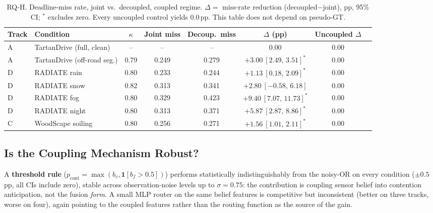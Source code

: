 \documentclass[conference]{IEEEtran}
\begin{document}
\begin{table}[htbp]
\caption{RQ-H. Deadline-miss rate, joint vs.\ decoupled, coupled
regime. $\Delta=$ miss-rate reduction (decoupled$-$joint), pp, 95\%
CI; $^\ast$ excludes zero. Every uncoupled control yields $0.0$\,pp.
This table does not depend on pseudo-GT.}
\label{tab:rqh}
\centering
\small
\setlength{\tabcolsep}{5pt}
\begin{tabular}{llcccccc}
\toprule
\textbf{Track} & \textbf{Condition} & \textbf{$\kappa$} &
\textbf{Joint miss} & \textbf{Decoup.\ miss} &
\textbf{$\Delta$ (pp)} & \textbf{Uncoupled $\Delta$} \\
\midrule
A & TartanDrive (full, clean)   & --   & --    & --    & $0.00$ & $0.00$ \\
A & TartanDrive (off-road seg.) & 0.79 & 0.249 & 0.279 & $+3.00\ [2.49,\,3.51]^\ast$ & $0.00$ \\
D & RADIATE rain                & 0.80 & 0.233 & 0.244 & $+1.13\ [0.18,\,2.09]^\ast$  & $0.00$ \\
D & RADIATE snow                & 0.82 & 0.313 & 0.341 & $+2.80\ [-0.58,\,6.18]$      & $0.00$ \\
D & RADIATE fog                 & 0.80 & 0.329 & 0.423 & $+9.40\ [7.07,\,11.73]^\ast$ & $0.00$ \\
D & RADIATE night               & 0.80 & 0.313 & 0.371 & $+5.87\ [2.87,\,8.86]^\ast$  & $0.00$ \\
C & WoodScape soiling           & 0.80 & 0.256 & 0.271 & $+1.56\ [1.01,\,2.11]^\ast$  & $0.00$ \\
\bottomrule
\end{tabular}
\end{table}

\subsection{Is the Coupling Mechanism Robust?}

A \textbf{threshold rule} ($p_{\text{cont}}=\max(b_c,\mathbf{1}[b_f{>}0.5])$)
performs statistically indistinguishably from the noisy-OR on every
condition ($\pm0.5$\,pp, all CIs include zero), stable across
observation-noise levels up to $\sigma{=}0.75$: the contribution is
coupling sensor belief into contention anticipation, not the fusion
\emph{form}. A small MLP router on the same belief features is
competitive but inconsistent (better on three tracks, worse on four),
again pointing to the coupled features rather than the routing
function as the source of the gain.
\end{document}
